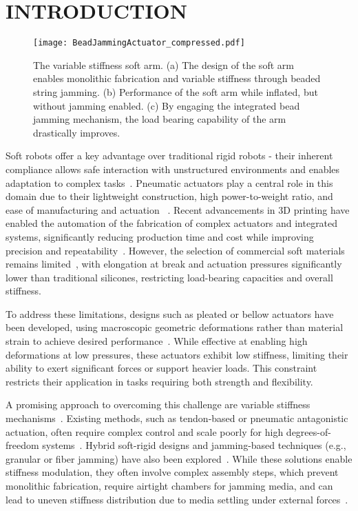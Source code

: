 \section{INTRODUCTION}
\begin{figure}[!t]
    \centering
    \texttt{[image: BeadJammingActuator\_compressed.pdf]}
    \caption{The variable stiffness soft arm. (a) The design of the soft arm enables monolithic fabrication and variable stiffness through beaded string jamming. (b) Performance of the soft arm while inflated, but without jamming enabled. (c) By engaging the integrated bead jamming mechanism, the load bearing capability of the arm drastically improves.}
    \label{fig:figure1}
\end{figure}

Soft robots offer a key advantage over traditional rigid robots - their inherent compliance allows safe interaction with unstructured environments and enables adaptation to complex tasks~\cite{softrobot1, softrobot2}. 
Pneumatic actuators play a central role in this domain due to their lightweight construction, high power-to-weight ratio, and ease of manufacturing and actuation ~\cite{xavier2022soft}. 
Recent advancements in 3D printing have enabled the automation of the fabrication of complex actuators and integrated systems, significantly reducing production time and cost while improving precision and repeatability~\cite{3dprinting, wang2022modular, zhai2023desktop, wehner2016integrated}.
However, the selection of commercial soft materials remains limited~\cite{3dprintingmaterial}, with elongation at break and actuation pressures significantly lower than traditional silicones, restricting load-bearing capacities and overall stiffness.
%

To address these limitations, designs such as pleated or bellow actuators have been developed, using macroscopic geometric deformations rather than material strain to achieve desired performance~\cite{pleated/bellow}. While effective at enabling high deformations at low pressures, these actuators exhibit low stiffness, limiting their ability to exert significant forces or support heavier loads. This constraint restricts their application in tasks requiring both strength and flexibility.

A promising approach to overcoming this challenge are variable stiffness mechanisms~\cite{stiffness_review}. Existing methods, such as tendon-based or pneumatic antagonistic actuation, often require complex control and scale poorly for high degrees-of-freedom systems~\cite{tendon_stiffening, pneumatic_stiffening}.
%
Hybrid soft-rigid designs and jamming-based techniques (e.g., granular or fiber jamming) have also been explored~\cite{soft-rigid,selective_jamming, Strings_of_Beads, Jammkle, Jeg}. 
%
While these solutions enable stiffness modulation, they often involve complex assembly steps, which prevent monolithic fabrication, require airtight chambers for jamming media, and can lead to uneven stiffness distribution due to media settling under external forces~\cite{VSspine}.


